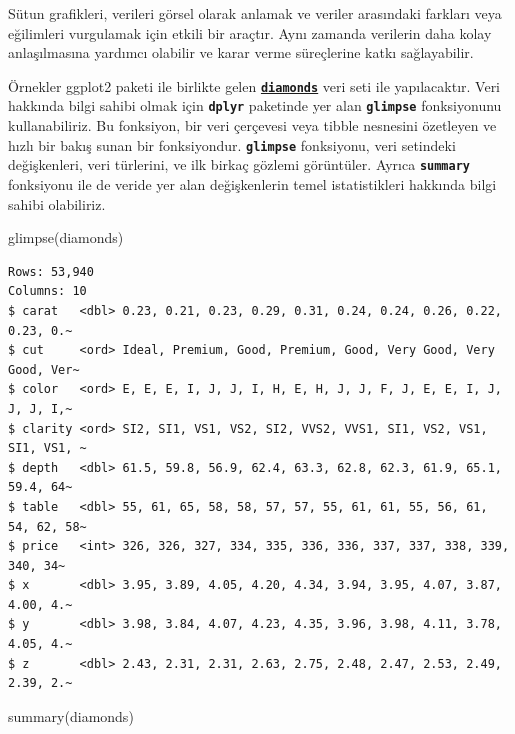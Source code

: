 \documentclass[
  letterpaper,
  DIV=11,
  numbers=noendperiod]{scrreprt}
\newenvironment{Shaded}{\begin{snugshade}}{\end{snugshade}}
\newcommand{\FunctionTok}[1]{\textcolor[rgb]{0.28,0.35,0.67}{#1}}
\newcommand{\NormalTok}[1]{\textcolor[rgb]{0.00,0.23,0.31}{#1}}
\begin{document}
Sütun grafikleri, verileri görsel olarak anlamak ve veriler arasındaki
farkları veya eğilimleri vurgulamak için etkili bir araçtır. Aynı
zamanda verilerin daha kolay anlaşılmasına yardımcı olabilir ve karar
verme süreçlerine katkı sağlayabilir.

Örnekler ggplot2 paketi ile birlikte gelen
\href{https://ggplot2.tidyverse.org/reference/diamonds.html}{\textbf{\texttt{diamonds}}}
veri seti ile yapılacaktır. Veri hakkında bilgi sahibi olmak için
\textbf{\texttt{dplyr}} paketinde yer alan \textbf{\texttt{glimpse}}
fonksiyonunu kullanabiliriz. Bu fonksiyon, bir veri çerçevesi veya
tibble nesnesini özetleyen ve hızlı bir bakış sunan bir fonksiyondur.
\textbf{\texttt{glimpse}} fonksiyonu, veri setindeki değişkenleri, veri
türlerini, ve ilk birkaç gözlemi görüntüler. Ayrıca
\textbf{\texttt{summary}} fonksiyonu ile de veride yer alan
değişkenlerin temel istatistikleri hakkında bilgi sahibi olabiliriz.

\begin{Shaded}
\begin{Highlighting}[]
\FunctionTok{glimpse}\NormalTok{(diamonds)}
\end{Highlighting}
\end{Shaded}

\begin{verbatim}
Rows: 53,940
Columns: 10
$ carat   <dbl> 0.23, 0.21, 0.23, 0.29, 0.31, 0.24, 0.24, 0.26, 0.22, 0.23, 0.~
$ cut     <ord> Ideal, Premium, Good, Premium, Good, Very Good, Very Good, Ver~
$ color   <ord> E, E, E, I, J, J, I, H, E, H, J, J, F, J, E, E, I, J, J, J, I,~
$ clarity <ord> SI2, SI1, VS1, VS2, SI2, VVS2, VVS1, SI1, VS2, VS1, SI1, VS1, ~
$ depth   <dbl> 61.5, 59.8, 56.9, 62.4, 63.3, 62.8, 62.3, 61.9, 65.1, 59.4, 64~
$ table   <dbl> 55, 61, 65, 58, 58, 57, 57, 55, 61, 61, 55, 56, 61, 54, 62, 58~
$ price   <int> 326, 326, 327, 334, 335, 336, 336, 337, 337, 338, 339, 340, 34~
$ x       <dbl> 3.95, 3.89, 4.05, 4.20, 4.34, 3.94, 3.95, 4.07, 3.87, 4.00, 4.~
$ y       <dbl> 3.98, 3.84, 4.07, 4.23, 4.35, 3.96, 3.98, 4.11, 3.78, 4.05, 4.~
$ z       <dbl> 2.43, 2.31, 2.31, 2.63, 2.75, 2.48, 2.47, 2.53, 2.49, 2.39, 2.~
\end{verbatim}

\begin{Shaded}
\begin{Highlighting}[]
\FunctionTok{summary}\NormalTok{(diamonds)}
\end{Highlighting}
\end{Shaded}
\end{document}
